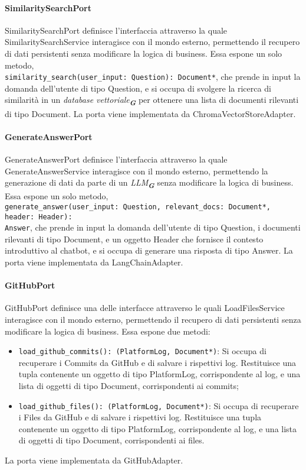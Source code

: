 \newpage


\label{sec:port}

\paragraph{SimilaritySearchPort}
\label{sec:similarity_search_port}
SimilaritySearchPort definisce l'interfaccia attraverso la quale SimilaritySearchService interagisce con il mondo esterno, permettendo il recupero di dati persistenti senza modificare la logica di business. Essa espone un solo metodo,\\ \texttt{similarity\_search(user\_input: Question): Document*}, che prende in input la domanda dell'utente di tipo Question, e si occupa di svolgere la ricerca di similarità in un \emph{database vettoriale}\textsubscript{\textbf{\textit{G}}} per ottenere una lista di documenti rilevanti di tipo Document. La porta viene implementata da ChromaVectorStoreAdapter.

\paragraph{GenerateAnswerPort}
\label{sec:generate_answer_port}
GenerateAnswerPort definisce l'interfaccia attraverso la quale GenerateAnswerService interagisce con il mondo esterno, permettendo la generazione di dati da parte di un \emph{LLM}\textsubscript{\textbf{\textit{G}}} senza modificare la logica di business. Essa espone un solo metodo,\\ \texttt{generate\_answer(user\_input: Question, relevant\_docs: Document*, header: Header):\\ Answer}, che prende in input la domanda dell'utente di tipo Question, i documenti rilevanti di tipo Document, e un oggetto Header che fornisce il contesto introduttivo al chatbot, e si occupa di generare una risposta di tipo Answer. La porta viene implementata da LangChainAdapter.

\paragraph{GitHubPort}
\label{sec:github_port}
GitHubPort definisce una delle interfacce attraverso le quali LoadFilesService interagisce con il mondo esterno, permettendo il recupero di dati persistenti senza modificare la logica di business. Essa espone due metodi:
\begin{itemize}
    \item \texttt{load\_github\_commits(): (PlatformLog, Document*)}: Si occupa di recuperare i Commits da GitHub e di salvare i rispettivi log. Restituisce una tupla contenente un oggetto di tipo PlatformLog, corrispondente al log, e una lista di oggetti di tipo Document, corrispondenti ai commits;
    \item \texttt{load\_github\_files(): (PlatformLog, Document*)}: Si occupa di recuperare i Files da GitHub e di salvare i rispettivi log. Restituisce una tupla contenente un oggetto di tipo PlatformLog, corrispondente al log, e una lista di oggetti di tipo Document, corrispondenti ai files.
\end{itemize}
La porta viene implementata da GitHubAdapter.

